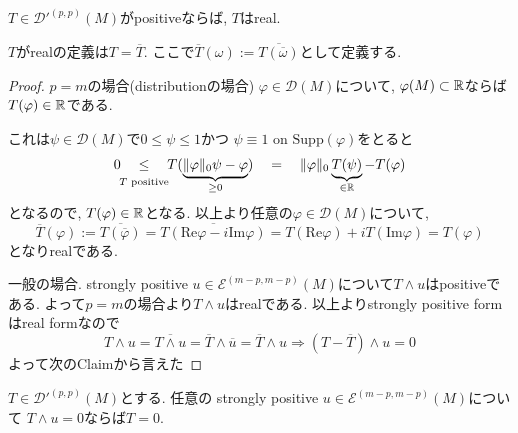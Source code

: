 \begin{tcolorbox}[mybox]
\begin{lem}
\label{lem-M-7.4.9}
$T \in {\mathcal{D}'}^{(p,p)}(M)$がpositiveならば, $T$はreal.
\end{lem}
\end{tcolorbox}
 $T$がrealの定義は$T = \overline{T}$. ここで$\overline{T}(\omega):=\overline{T(\overline{\omega})}$として定義する.
\begin{proof}
$p=m$の場合(distributionの場合)
$\varphi\in {\mathcal{D}}(M)$について, 
$\varphi(M) \subset \mathbb{R}$ならば$T(\varphi) \in \mathbb{R}$である. 

これは$\psi \in {\mathcal{D}}(M)$で$0 \le \psi \le 1$かつ $\psi \equiv 1$ on $\mathrm{Supp}(\varphi)$をとると
$$
0 \underalign{\text{$T$ positive}}{\le} T(\underbrace{\| \varphi\|_0 \psi - \varphi}_{ \ge 0}) 
\underalign{}{=} 
 \| \varphi\|_0 \underbrace{T(\psi)}_{\in \R}-T(\varphi) 
$$
となるので, $T(\varphi)  \in \mathbb{R}$となる. 
以上より任意の$\varphi\in {\mathcal{D}}(M)$について, 
$$
\overline{T}(\varphi):=\overline{T(\overline{\varphi})}
=\overline{T(\mathrm{Re}\varphi - i \mathrm{Im}\varphi)}
=T(\mathrm{Re}\varphi )+iT(\mathrm{Im}\varphi )
=T(\varphi)
$$
となりrealである. 

一般の場合. strongly positive $u \in {\mathcal{E}}^{(m-p,m-p)}(M)$について$T \wedge u$はpositiveである. 
よって$p=m$の場合より$T \wedge u$はrealである. 
以上よりstrongly positive formはreal formなので
$$
T \wedge u
=\overline{T \wedge u}
=\overline{T}\wedge  \overline{u}
=\overline{T}\wedge  u
\Rightarrow (T - \overline{T}) \wedge u =0
$$
よって次のClaimから言えた
\end{proof}
\begin{claim}
$T \in {\mathcal{D}'}^{(p,p)}(M)$とする. 
任意の strongly positive $u \in {\mathcal{E}}^{(m-p,m-p)}(M)$について
$T \wedge u=0$ならば$T=0$.
\end{claim}
